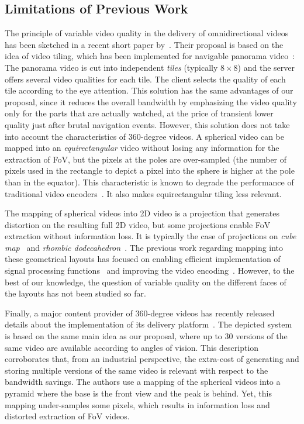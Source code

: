 \subsection{Limitations of Previous Work}

The principle of variable video quality in the delivery of omnidirectional videos has been sketched 
in a recent short paper by~\citet{ochi_live_2015}. Their proposal is based on the idea of video
tiling, which has been implemented for navigable panorama 
video~\cite{sanchez_compressed_2015,wang_mixing_2014,gaddam_tiling_2015}: The panorama video 
is cut into independent \emph{tiles} (typically $8\times 8$) and the server offers several
video qualities for each tile. The client selects the quality of each tile according to the eye attention. This
solution has the same advantages of our proposal, since it reduces the overall bandwidth by emphasizing
the video quality only for the parts that are actually watched, at the price of transient lower quality just after
brutal navigation events. However, this solution does not take into account the characteristics of 360-degree
videos. A spherical video can be mapped into an \emph{equirectangular} video without losing any information
for the extraction of \ac{FoV}, but the pixels at the poles are over-sampled (the number of pixels
used in the rectangle to depict a pixel into the sphere is higher at the pole than in the equator). 
This characteristic is known to degrade the
performance of traditional video encoders~\cite{wojciechowski_h.264_2006,yu_framework_2015}. It also 
makes equirectangular tiling less relevant.

The mapping of spherical videos into 2D video is a projection that generates distortion on the resulting
full 2D video, but some projections enable \ac{FoV} extraction without information loss. It is typically the case of 
projections on \emph{cube map}~\cite{Ng2005} and 
\emph{rhombic dodecahedron}~\cite{fu_rhombic_2009}. The previous work regarding mapping into these
geometrical layouts has focused on enabling efficient implementation of signal processing 
functions~\cite{kazhdan_metric-aware_2010} and improving the video encoding~\cite{tosic_low_2009}. 
However, to the best of our knowledge, the 
question of variable quality on the different faces of the layouts has not been studied so far.

Finally, a major content provider of 360-degree videos has recently released details about the 
implementation of its delivery platform~\cite{facebook}. The depicted system is based on the same
main idea as our proposal, where up to 30 versions of the same video are available according to angles
of vision. This description corroborates that, from an industrial perspective, the extra-cost of
generating and storing multiple versions of the same video is relevant with respect to the bandwidth
savings. The authors use a mapping of the spherical videos into a pyramid where the base is the front
view and the peak is behind. Yet, this mapping under-samples some pixels, which results in 
information loss and distorted extraction of \ac{FoV} videos.

